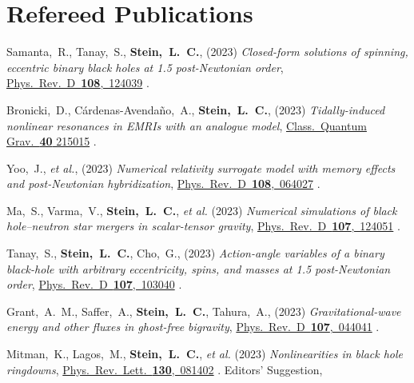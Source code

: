 \section{\sc Refereed Publications}
\addtocounter{pubCounter}{-1}
\begin{etaremune}[start=\value{pubCounter}]
\item
  Samanta,~R.,
  Tanay,~S.,
  {\bf Stein,~L.~C.},
  (2023)
  {\it Closed-form solutions of spinning, eccentric binary black holes at 1.5 post-Newtonian order},
  \href{https://doi.org/10.1103/PhysRevD.108.124039}%
  {Phys.~Rev.~D~{\bf 108},~124039}
  .
\item
  Bronicki,~D.,
  Cárdenas-Avendaño,~A.,
  {\bf Stein,~L.~C.},
  (2023)
  {\it Tidally-induced nonlinear resonances in EMRIs with an analogue model},
  \href{https://doi.org/10.1088/1361-6382/acfcfe}%
  {Class.~Quantum Grav.~{\bf 40} 215015}
  .
\item
  Yoo,~J., {\it et al.},
  (2023)
  {\it Numerical relativity surrogate model with memory effects and post-Newtonian hybridization},
  \href{https://doi.org/10.1103/PhysRevD.108.064027}%
  {Phys.~Rev.~D~{\bf 108},~064027}
  .
\item
  Ma,~S.,
  Varma,~V.,
  {\bf Stein,~L.~C.},
  {\it et al.}
  (2023)
  {\it Numerical simulations of black hole--neutron star mergers in scalar-tensor gravity},
  \href{https://doi.org/10.1103/PhysRevD.107.124051}%
  {Phys.~Rev.~D~{\bf 107},~124051}
  .
\item
  Tanay,~S.,
  {\bf Stein,~L.~C.},
  Cho,~G.,
  (2023)
  {\it Action-angle variables of a binary black-hole with arbitrary eccentricity, spins, and masses at 1.5 post-Newtonian order},
  \href{https://doi.org/10.1103/PhysRevD.107.103040}%
  {Phys.~Rev.~D~{\bf 107},~103040}
  .
\item
  Grant,~A.~M.,
  Saffer,~A.,
  {\bf Stein,~L.~C.},
  Tahura,~A.,
  (2023)
  {\it Gravitational-wave energy and other fluxes in ghost-free bigravity},
  \href{https://doi.org/10.1103/PhysRevD.107.044041}%
  {Phys.~Rev.~D~{\bf 107},~044041}
  .
\item
  Mitman,~K.,
  Lagos,~M.,
  {\bf Stein,~L.~C.},
  {\it et al.}
  (2023)
  {\it Nonlinearities in black hole ringdowns},
  \href{https://doi.org/10.1103/PhysRevLett.130.081402}{Phys.~Rev.~Lett.~{\bf 130},~081402}
  .
  \raisebox{.15em}{\aldine} Editors' Suggestion,

\end{etaremune}
